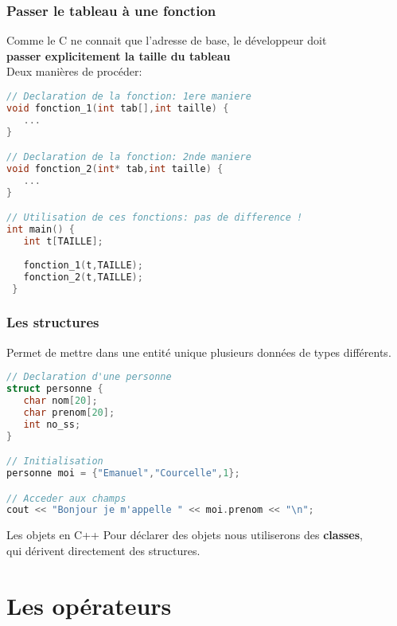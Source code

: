 \documentclass{beamer}
\begin{document}
\begin{frame}[fragile=singleslide,shrink=20]
\frametitle{Passer le tableau à une fonction}
Comme le C ne connait que l'adresse de base, le développeur doit \\
\textbf{passer explicitement la taille du tableau} \\
Deux manières de procéder:
\begin{lstlisting}[language=c++]
// Declaration de la fonction: 1ere maniere
void fonction_1(int tab[],int taille) {
   ...
}

// Declaration de la fonction: 2nde maniere
void fonction_2(int* tab,int taille) {
   ...
}

// Utilisation de ces fonctions: pas de difference !
int main() {
   int t[TAILLE];
   
   fonction_1(t,TAILLE);
   fonction_2(t,TAILLE);
 }
\end{lstlisting}
\end{frame}

\begin{frame}[fragile=singleslide,shrink=20]
\frametitle{Les structures}
Permet de mettre dans une entité unique plusieurs données de types différents.
\begin{lstlisting}[language=c++]
// Declaration d'une personne
struct personne {
   char nom[20];
   char prenom[20];
   int no_ss;
}

// Initialisation
personne moi = {"Emanuel","Courcelle",1};

// Acceder aux champs
cout << "Bonjour je m'appelle " << moi.prenom << "\n";
\end{lstlisting}

\begin{block}{Les objets en C++}
Pour déclarer des objets nous utiliserons des \textbf{classes}, \\ qui dérivent directement des structures.
\end{block}
\end{frame}

\section{Les opérateurs}
\end{document}
